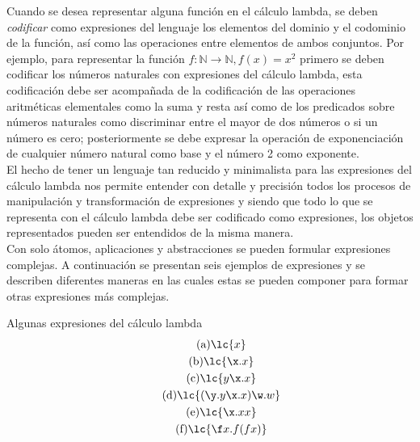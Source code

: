 Cuando se desea representar alguna función en el cálculo lambda, se deben \emph{codificar} como expresiones del lenguaje los elementos del dominio y el codominio de la función, así como las operaciones entre elementos de ambos conjuntos. Por ejemplo, para representar la función \(f : \mathbb{N} \to \mathbb{N}, f(x)=x^{2}\) primero se deben codificar los números naturales con expresiones del cálculo lambda, esta codificación debe ser acompañada de la codificación de las operaciones aritméticas elementales como la suma y resta así como de los predicados sobre números naturales como discriminar entre el mayor de dos números o si un número es cero; posteriormente se debe expresar la operación de exponenciación de cualquier número natural como base y el número 2 como exponente. \\

El hecho de tener un lenguaje tan reducido y minimalista para las expresiones del cálculo lambda nos permite entender con detalle y precisión todos los procesos de manipulación y transformación de expresiones y siendo que todo lo que se representa con el cálculo lambda debe ser codificado como expresiones, los objetos representados pueden ser entendidos de la misma manera. \\

Con solo átomos, aplicaciones y abstracciones se pueden formular expresiones complejas. A continuación se presentan seis ejemplos de expresiones y se describen diferentes maneras en las cuales estas se pueden componer para formar otras expresiones más complejas. \\

\begin{ejemplo} Algunas expresiones del cálculo lambda
  \label{ejemplo:expresiones1}
  \begin{subequations}
    \begin{gather}
      \label{ejemplo:expresiones1:a} \tag{a}
      \lc{x}
      \\
      \label{ejemplo:expresiones1:b} \tag{b}
      \lc{\x.x}
      \\
      \label{ejemplo:expresiones1:c} \tag{c}
      \lc{y\x.x}
      \\
      \label{ejemplo:expresiones1:d} \tag{d}
      \lc{(\y.y\x.x)\w.w}
      \\
      \label{ejemplo:expresiones1:e} \tag{e}
      \lc{\x.x x}
      \\
      \label{ejemplo:expresiones1:f} \tag{f}
      \lc{\f x.f(f x)}
    \end{gather}
  \end{subequations}
\end{ejemplo} \

